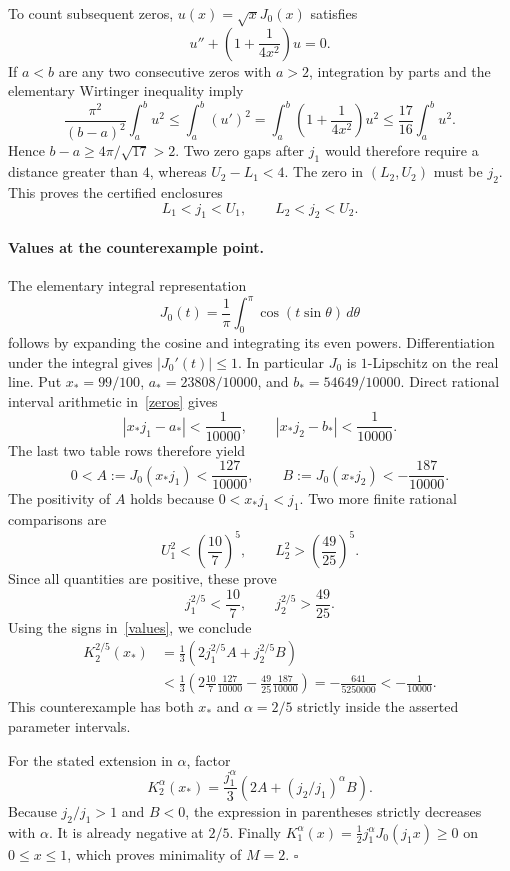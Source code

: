\documentclass[11pt]{article}
\newcommand{\J}{J_0}
\begin{document}
To count subsequent zeros, \(u(x)=\sqrt{x}\J(x)\) satisfies
\[
 u''+\left(1+\frac{1}{4x^2}\right)u=0.
\]
If \(a<b\) are any two consecutive zeros with \(a>2\), integration
by parts and the elementary Wirtinger inequality imply
\[
 \frac{\pi^2}{(b-a)^2}\int_a^bu^2
 \le\int_a^b(u')^2
 =\int_a^b\left(1+\frac{1}{4x^2}\right)u^2
 \le\frac{17}{16}\int_a^bu^2.
\]
Hence \(b-a\ge4\pi/\sqrt{17}>2\). Two zero gaps after \(j_1\)
would therefore require a distance greater than \(4\), whereas
\(U_2-L_1<4\). The zero in \((L_2,U_2)\) must be \(j_2\).
This proves the certified enclosures
\begin{equation}\label{zeros}
 L_1<j_1<U_1,\qquad L_2<j_2<U_2.
\end{equation}

\paragraph{Values at the counterexample point.}
The elementary integral representation
\[
 \J(t)=\frac1\pi\int_0^\pi\cos(t\sin\theta)\,d\theta
\]
follows by expanding the cosine and integrating its even powers.
Differentiation under the integral gives \(|\J'(t)|\le1\).
In particular \(\J\) is \(1\)-Lipschitz on the real line.
Put \(x_*=99/100\), \(a_*=23808/10000\), and
\(b_*=54649/10000\). Direct rational interval arithmetic
in~\eqref{zeros} gives
\[
 |x_*j_1-a_*|<\frac1{10000},
 \qquad |x_*j_2-b_*|<\frac1{10000}.
\]
The last two table rows therefore yield
\begin{equation}\label{values}
 0< A:=\J(x_*j_1)<\frac{127}{10000},
 \qquad B:=\J(x_*j_2)<-\frac{187}{10000}.
\end{equation}
The positivity of \(A\) holds because \(0<x_*j_1<j_1\).
Two more finite rational comparisons are
\[
 U_1^2<\left(\frac{10}{7}\right)^5,
 \qquad L_2^2>\left(\frac{49}{25}\right)^5.
\]
Since all quantities are positive, these prove
\[
 j_1^{2/5}<\frac{10}{7},
 \qquad j_2^{2/5}>\frac{49}{25}.
\]
Using the signs in~\eqref{values}, we conclude
\[
\begin{split}
 K_2^{2/5}(x_*)
 &=\frac13\left(2j_1^{2/5}A+j_2^{2/5}B\right)\\
 &<\frac13\left(
 2\frac{10}{7}\frac{127}{10000}
 -\frac{49}{25}\frac{187}{10000}\right)
 =-\frac{641}{5250000}<-\frac1{10000}.
\end{split}
\]
This counterexample has both \(x_*\) and \(\alpha=2/5\) strictly
inside the asserted parameter intervals.

For the stated extension in \(\alpha\), factor
\[
 K_2^\alpha(x_*)=\frac{j_1^\alpha}{3}
       \left(2A+(j_2/j_1)^\alpha B\right).
\]
Because \(j_2/j_1>1\) and \(B<0\), the expression in parentheses
strictly decreases with \(\alpha\). It is already negative at \(2/5\).
Finally \(K_1^\alpha(x)=\tfrac12j_1^\alpha\J(j_1x)\ge0\)
on \(0\le x\le1\), which proves minimality of \(M=2\).
\hfill\(\square\)
\end{document}
